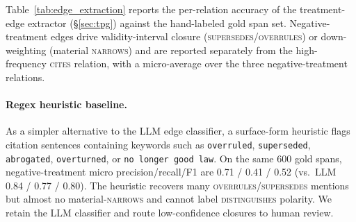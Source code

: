 Table~\ref{tab:edge_extraction} reports the per-relation accuracy of the treatment-edge extractor (\S\ref{sec:tpg}) against the hand-labeled gold span set. Negative-treatment edges drive validity-interval closure (\textsc{supersedes}/\textsc{overrules}) or down-weighting (material \textsc{narrows}) and are reported separately from the high-frequency \textsc{cites} relation, with a micro-average over the three negative-treatment relations.

\begin{table}[h]
\centering
\caption{Treatment-edge extraction accuracy against the 600 hand-labeled gold citation spans (\S\ref{sec:tpg}).}
\label{tab:edge_extraction}
\small
\setlength{\tabcolsep}{5pt}
\end{table}

\paragraph{Regex heuristic baseline.}
As a simpler alternative to the LLM edge classifier, a surface-form heuristic flags citation sentences containing keywords such as \texttt{overruled}, \texttt{superseded}, \texttt{abrogated}, \texttt{overturned}, or \texttt{no longer good law}. On the same 600 gold spans, negative-treatment micro precision/recall/F1 are 0.71 / 0.41 / 0.52 (vs.\ LLM 0.84 / 0.77 / 0.80). The heuristic recovers many \textsc{overrules}/\textsc{supersedes} mentions but almost no material-\textsc{narrows} and cannot label \textsc{distinguishes} polarity. We retain the LLM classifier and route low-confidence closures to human review.


